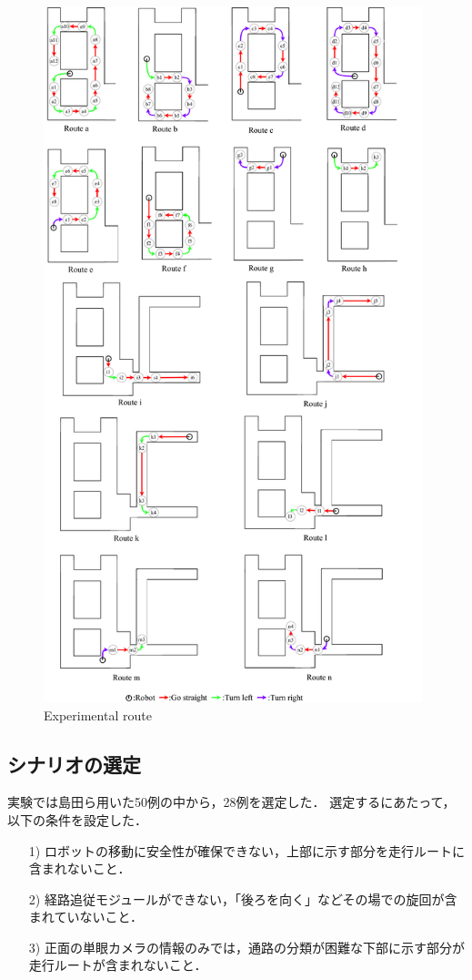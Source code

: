 \begin{figure}
  \centering
  \includegraphics[width=110mm]{images/pdf/ishiguro/route.pdf}
  \caption{Experimental route}
  \label{fig:route}
\end{figure}

\newpage
\subsection{シナリオの選定}
実験では島田ら用いた50例の中から，28例を選定した．
選定するにあたって，以下の条件を設定した．

\begin{enumerate}
  \item [1)] ロボットの移動に安全性が確保できない，上部に示す部分を走行ルートに含まれないこと．
  \item [2)] 経路追従モジュールができない，「後ろを向く」などその場での旋回が含まれていないこと．
  \item [3)] 正面の単眼カメラの情報のみでは，通路の分類が困難な下部に示す部分が走行ルートが含まれないこと．
\end{enumerate}

